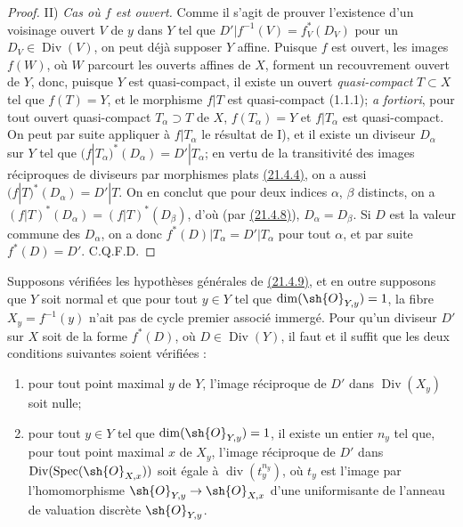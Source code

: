 \begin{proof}
\textup{II)} \emph{Cas où $f$ est ouvert.} Comme il s'agit de prouver
l'existence d'un voisinage ouvert $V$ de $y$ dans $Y$ tel que
$D'|f^{-1}(V)=f_V^*(D_V)$ pour un $D_V\in\operatorname{Div}(V)$, on
peut déjà supposer $Y$ affine. Puisque $f$ est ouvert, les images
$f(W)$, où $W$ parcourt les ouverts affines de $X$, forment un
recouvrement ouvert de $Y$, donc, puisque $Y$ est quasi-compact, il
existe un ouvert \emph{quasi-compact} $T\subset X$ tel que $f(T)=Y$, et le
morphisme $f|T$ est quasi-compact (1.1.1); \emph{a fortiori}, pour
tout ouvert quasi-compact $T_\alpha\supset T$ de $X$,
$f(T_\alpha)=Y$ et $f|T_\alpha$ est quasi-compact. On peut par suite
appliquer à $f|T_\alpha$ le résultat de I), et il existe un diviseur
$D_\alpha$ sur $Y$ tel que $(f|T_\alpha)^*(D_\alpha)=D'|T_\alpha$;
en vertu de la transitivité des images réciproques de diviseurs par
morphismes plats {\hyperlink{ega4.c04.statement.21-4-4}{(21.4.4)}}, on
a aussi $(f|T)^*(D_\alpha)=D'|T$. On en conclut que pour deux indices
$\alpha$, $\beta$ distincts, on a $(f|T)^*(D_\alpha)=(f|T)^*(D_\beta)$,
d'où (par {\hyperlink{ega4.c04.prop.21-4-8}{(21.4.8)}}),
$D_\alpha=D_\beta$. Si $D$ est la valeur commune des $D_\alpha$, on a
donc $f^*(D)|T_\alpha=D'|T_\alpha$ pour tout $\alpha$, et par suite
$f^*(D)=D'$. C.Q.F.D.
\end{proof}

\begin{corollary}[21.4.10]
Supposons vérifiées les hypothèses générales de
\textup{\hyperlink{ega4.c04.prop.21-4-9}{(21.4.9)}}, et en outre supposons que
$Y$ soit normal et que pour tout $y\in Y$ tel que
$\dim(\sh{O}_{Y,y})=1$, la fibre $X_y=f^{-1}(y)$ n'ait pas de cycle
premier associé immergé. Pour qu'un diviseur $D'$ sur $X$ soit de la
forme $f^*(D)$, où $D\in\operatorname{Div}(Y)$, il faut et il suffit
que les deux conditions suivantes soient vérifiées :
\begin{enumerate}[label=\textup{\arabic*\textdegree}]
\item pour tout point maximal $y$ de $Y$, l'image réciproque de $D'$
dans $\operatorname{Div}(X_y)$ soit nulle;
\item pour tout $y\in Y$ tel que $\dim(\sh{O}_{Y,y})=1$, il existe un
entier $n_y$ tel que, pour tout point maximal $x$ de $X_y$, l'image
réciproque de $D'$ dans
$\operatorname{Div}(\operatorname{Spec}(\sh{O}_{X,x}))$ soit égale à
$\operatorname{div}(t_y^{n_y})$, où $t_y$ est l'image par
l'homomorphisme $\sh{O}_{Y,y}\to\sh{O}_{X,x}$ d'une uniformisante de
l'anneau de valuation discrète $\sh{O}_{Y,y}$.
\end{enumerate}
\end{corollary}

